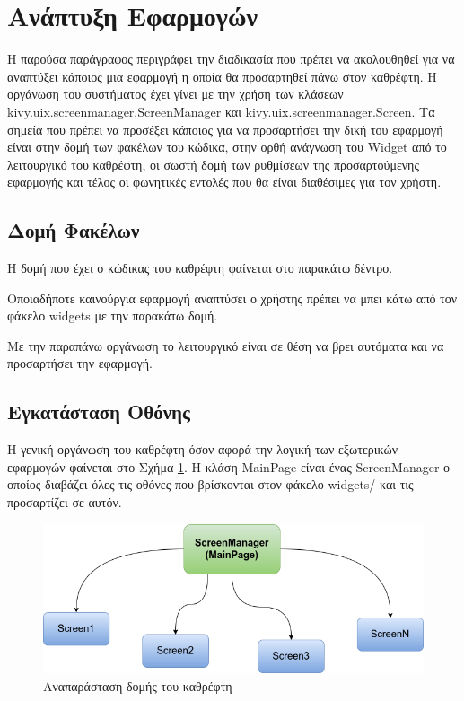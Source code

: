 \section{Ανάπτυξη Εφαρμογών}
\label{sec:development}

Η παρούσα παράγραφος περιγράφει την διαδικασία που πρέπει να ακολουθηθεί για να αναπτύξει κάποιος μια εφαρμογή η οποία θα προσαρτηθεί πάνω στον καθρέφτη. Η οργάνωση του συστήματος έχει γίνει με την χρήση των κλάσεων kivy.uix.screenmanager.ScreenManager και kivy.uix.screenmanager.Screen. Τα σημεία που πρέπει να προσέξει κάποιος για να προσαρτήσει την δική του εφαρμογή είναι στην δομή των φακέλων του κώδικα, στην ορθή ανάγνωση του Widget από το λειτουργικό του καθρέφτη, οι σωστή δομή των ρυθμίσεων της προσαρτούμενης εφαρμογής και τέλος οι φωνητικές εντολές που θα είναι διαθέσιμες για τον χρήστη.

\subsection{Δομή Φακέλων}
Η δομή που έχει ο κώδικας του καθρέφτη φαίνεται στο παρακάτω δέντρο.
\\


Οποιαδήποτε καινούργια εφαρμογή αναπτύσει ο χρήστης πρέπει να μπει κάτω από τον φάκελο widgets με την παρακάτω δομή. \\


Με την παραπάνω οργάνωση το λειτουργικό είναι σε θέση να βρει αυτόματα και να προσαρτήσει την εφαρμογή.

\subsection{Εγκατάσταση Οθόνης}
Η γενική οργάνωση του καθρέφτη όσον αφορά την λογική των εξωτερικών εφαρμογών φαίνεται στο Σχήμα \ref{fig:widget_organization}. Η κλάση MainPage είναι ένας ScreenManager ο οποίος διαβάζει όλες τις οθόνες που βρίσκονται στον φάκελο widgets/ και τις προσαρτίζει σε αυτόν.

\begin{figure}[h]
	\centering
	\includegraphics[scale=0.7]{images/chapter4/widget_organization.png}
	\caption{Αναπαράσταση δομής του καθρέφτη}
	\label{fig:widget_organization}
\end{figure}


